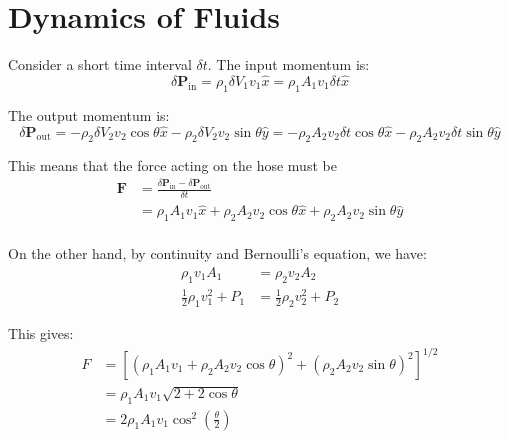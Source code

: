 \documentclass[12pt]{article}
\begin{document}



\pagebreak
\section*{Dynamics of Fluids}


Consider a short time interval $\delta t$. The input momentum is:
\begin{equation}
    \delta \mathbf{P}_{\text{in}} = \rho_{1} \delta V_{1} v_{1} \hat{x} = \rho_{1} A_{1} v_{1} \delta t \hat{x}
\end{equation}

The output momentum is:
\begin{equation}
    \delta \mathbf{P}_{\text{out}} = -\rho_{2} \delta V_{2} v_{2} \cos{\theta} \hat{x} - \rho_{2} \delta V_{2} v_{2} \sin{\theta} \hat{y} = -\rho_{2} A_{2} v_{2} \delta t \cos{\theta} \hat{x} - \rho_{2} A_{2} v_{2} \delta t \sin{\theta} \hat{y}
\end{equation}

This means that the force acting on the hose must be
\begin{equation}
    \begin{split}
        \mathbf{F} &= \frac{\delta \mathbf{P}_{\text{in}} - \delta \mathbf{P}_{\text{out}}}{\delta t} \\
        &= \rho_{1} A_{1} v_{1} \hat{x} + \rho_{2} A_{2} v_{2} \cos{\theta} \hat{x} + \rho_{2} A_{2} v_{2} \sin{\theta} \hat{y} \\
    \end{split}
\end{equation}

On the other hand, by continuity and Bernoulli's equation, we have:
\begin{equation}
    \begin{split}
        \rho_{1} v_{1} A_{1} &= \rho_{2} v_{2} A_{2} \\
        \frac{1}{2} \rho_{1} v_{1}^{2} + P_{1} &= \frac{1}{2} \rho_{2} v_{2}^{2} + P_{2}
    \end{split}
\end{equation}

This gives:
\begin{equation}
    \begin{split}
        F &= \left[ \left( \rho_{1} A_{1} v_{1} + \rho_{2} A_{2} v_{2} \cos{\theta} \right)^{2} + \left( \rho_{2} A_{2} v_{2} \sin{\theta} \right)^{2} \right]^{1/2} \\
        &= \rho_{1} A_{1} v_{1} \sqrt{2 + 2\cos{\theta}} \\
        &= 2\rho_{1} A_{1} v_{1} \cos^{2}{\left( \frac{\theta}{2} \right)}
    \end{split}
\end{equation}
\end{document}
